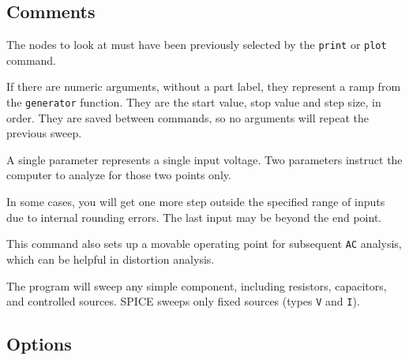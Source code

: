\subsection{Comments}

The nodes to look at must have been previously selected by the {\tt print} or
{\tt plot} command.

If there are numeric arguments, without a part label, they represent a ramp
from the {\tt generator} function.  They are the start value, stop value
and step size, in order.  They are saved between commands, so no arguments
will repeat the previous sweep.

A single parameter represents a single input voltage.  Two parameters
instruct the computer to analyze for those two points only.

In some cases, you will get one more step outside the specified range of
inputs due to internal rounding errors.  The last input may be beyond the end
point.

This command also sets up a movable operating point for subsequent {\tt AC}
analysis, which can be helpful in distortion analysis.

The program will sweep any simple component, including resistors,
capacitors, and controlled sources.  SPICE sweeps only fixed sources (types
{\tt V} and {\tt I}).
\subsection{Options}

